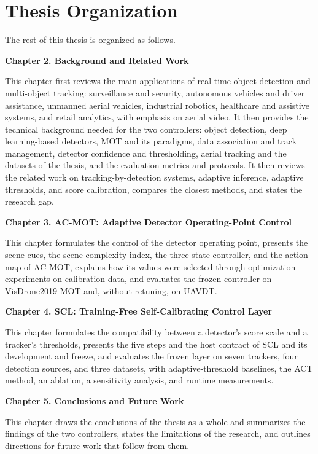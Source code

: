 \section{Thesis Organization}\label{sec:intro-organization}
The rest of this thesis is organized as follows.

\textbf{Chapter 2. Background and Related Work}

This chapter first reviews the main applications of real-time object detection and multi-object tracking: surveillance and security, autonomous vehicles and driver assistance, unmanned aerial vehicles, industrial robotics, healthcare and assistive systems, and retail analytics, with emphasis on aerial video. It then provides the technical background needed for the two controllers: object detection, deep learning-based detectors, MOT and its paradigms, data association and track management, detector confidence and thresholding, aerial tracking and the datasets of the thesis, and the evaluation metrics and protocols. It then reviews the related work on tracking-by-detection systems, adaptive inference, adaptive thresholds, and score calibration, compares the closest methods, and states the research gap.

\textbf{Chapter 3. AC-MOT: Adaptive Detector Operating-Point Control}

This chapter formulates the control of the detector operating point, presents the scene cues, the scene complexity index, the three-state controller, and the action map of AC-MOT, explains how its values were selected through optimization experiments on calibration data, and evaluates the frozen controller on VisDrone2019-MOT and, without retuning, on UAVDT.

\textbf{Chapter 4. SCL: Training-Free Self-Calibrating Control Layer}

This chapter formulates the compatibility between a detector's score scale and a tracker's thresholds, presents the five steps and the host contract of SCL and its development and freeze, and evaluates the frozen layer on seven trackers, four detection sources, and three datasets, with adaptive-threshold baselines, the ACT method, an ablation, a sensitivity analysis, and runtime measurements.

\textbf{Chapter 5. Conclusions and Future Work}

This chapter draws the conclusions of the thesis as a whole and summarizes the findings of the two controllers, states the limitations of the research, and outlines directions for future work that follow from them.
